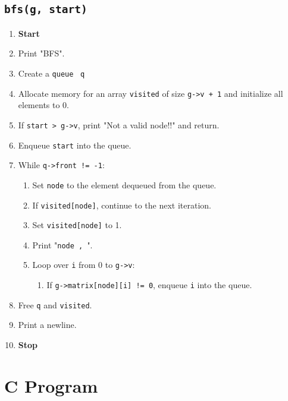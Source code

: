 {  \subsection{\texttt{bfs(g, start)}}
  \begin{enumerate}[label=\arabic*:,left=0pt]
    \item \textbf{Start}
    \item Print "BFS".
    \item Create a \texttt{queue} \ \texttt{q}
    \item Allocate memory for an array \texttt{visited} of size \texttt{g->v + 1} and initialize all elements to 0.
    \item If \texttt{start > g->v}, print "Not a valid node!!" and return.
    \item Enqueue \texttt{start} into the queue.
    \item While \texttt{q->front != -1}:
          \begin{enumerate}[label=7.\arabic*:, start=1]
            \item Set \texttt{node} to the element dequeued from the queue.
            \item If \texttt{visited[node]}, continue to the next iteration.
            \item Set \texttt{visited[node]} to 1.
            \item Print "\texttt{node , }".
            \item Loop over \texttt{i} from 0 to \texttt{g->v}:
                  \begin{enumerate}[label=7.5.\arabic*:, start=1]
                    \item If \texttt{g->matrix[node][i] != 0}, enqueue \texttt{i} into the queue.
                  \end{enumerate}
          \end{enumerate}
    \item Free \texttt{q} and \texttt{visited}.
    \item Print a newline.
    \item \textbf{Stop}
  \end{enumerate}
 }

\section{C Program}

